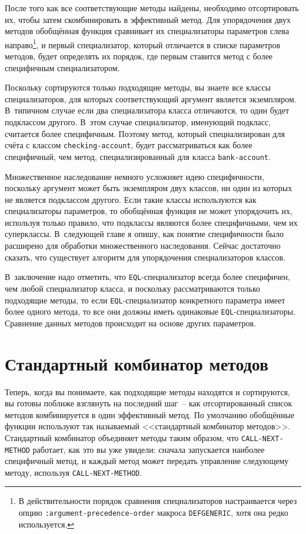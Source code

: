 После того как все соответствующие методы найдены, необходимо отсортировать их, чтобы
затем скомбинировать в эффективный метод.  Для упорядочения двух методов обобщённая
функция сравнивает их специализаторы параметров слева направо\footnote{В
  действительности порядок сравнения специализаторов настраивается через опцию
  \lstinline{:argument-precedence-order} макроса \lstinline{DEFGENERIC}, хотя она редко
  используется.}, и первый специализатор, который отличается в списке параметров методов,
будет определять их порядок, где первым ставится метод с более специфичным
специализатором.

Поскольку сортируются только подходящие методы, вы знаете все классы специализаторов, для
которых соответствующий аргумент является экземпляром.  В~типичном случае если два
специализатора класса отличаются, то один будет подклассом другого.  В~этом случае
специализатор, именующий подкласс, считается более специфичным.  Поэтому метод, который
специализирован для счёта с классом \lstinline{checking-account}, будет рассматриваться как
более специфичный, чем метод, специализированный для класса \lstinline{bank-account}.

Множественное наследование немного усложняет идею специфичности, поскольку аргумент может
быть экземпляром двух классов, ни один из которых не является подклассом другого.  Если
такие классы используются как специализаторы параметров, то обобщённая функция не может
упорядочить их, используя только правило, что подклассы являются более специфичными, чем их
суперклассы.  В~следующей главе я опишу, как понятие специфичности было расширено для
обработки множественного наследования.  Сейчас достаточно сказать, что существует алгоритм
для упорядочения специализаторов классов.

В~заключение надо отметить, что \lstinline{EQL}-специализатор всегда более специфичен, чем
любой специализатор класса, и поскольку рассматриваются только подходящие методы, то если
\lstinline{EQL}-специализатор конкретного параметра имеет более одного метода, то все они
должны иметь одинаковые \lstinline{EQL}-специализаторы.  Сравнение данных методов происходит на
основе других параметров.

\section{Стандартный комбинатор методов}

Теперь, когда вы понимаете, как подходящие методы находятся и сортируются, вы готовы
поближе взглянуть на последний шаг~-- как отсортированный список методов комбинируется в
один эффективный метод.  По умолчанию обобщённые функции используют так называемый
<<стандартный комбинатор методов>>.  Стандартный комбинатор объединяет методы таким образом,
что \lstinline{CALL-NEXT-METHOD} работает, как это вы уже увидели: сначала запускается
наиболее специфичный метод, и каждый метод может передать управление следующему методу,
используя \lstinline{CALL-NEXT-METHOD}.

